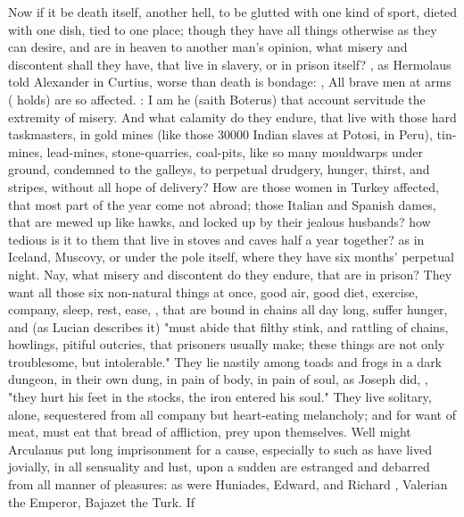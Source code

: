 Now if it be death itself, another hell, to be glutted with one kind of sport,
dieted with one dish, tied to one place; though they have all things otherwise
as they can desire, and are in heaven to another man's opinion, what misery and
discontent shall they have, that live in slavery, or in prison itself? , as Hermolaus told Alexander in
Curtius, worse than death is bondage:
, All brave men at arms (\Tully{} holds) are so affected.
: I am he (saith Boterus) that account servitude the
extremity of misery. And what calamity do they endure, that live with those
hard taskmasters, in gold mines (like those 30\thinspace{}000
Indian slaves at Potosi, in Peru), tin-mines, lead-mines,
stone-quarries, coal-pits, like so many mouldwarps under ground, condemned to
the galleys, to perpetual drudgery, hunger, thirst, and stripes, without all
hope of delivery? How are those women in Turkey affected, that most part of the
year come not abroad; those Italian and Spanish dames, that are mewed up like
hawks, and locked up by their jealous husbands? how tedious is it to them that
live in stoves and caves half a year together? as in Iceland, Muscovy, or under
the pole itself, where they have six months' perpetual
night. Nay, what misery and discontent do they endure, that are in prison? They
want all those six non-natural things at once, good air, good diet, exercise,
company, sleep, rest, ease, \etc{}, that are bound in chains all day long,
suffer hunger, and (as Lucian describes it) "must abide
that filthy stink, and rattling of chains, howlings, pitiful outcries, that
prisoners usually make; these things are not only troublesome, but
intolerable." They lie nastily among toads and frogs in a dark dungeon, in
their own dung, in pain of body, in pain of soul, as Joseph did, , "they hurt his feet in the stocks, the iron entered his soul."
They live solitary, alone, sequestered from all company but heart-eating
melancholy; and for want of meat, must eat that bread of affliction, prey upon
themselves. Well might Arculanus put long imprisonment for
a cause, especially to such as have lived jovially, in all sensuality and lust,
upon a sudden are estranged and debarred from all manner of pleasures: as were
Huniades, Edward, and Richard , Valerian the Emperor, Bajazet the Turk. If
